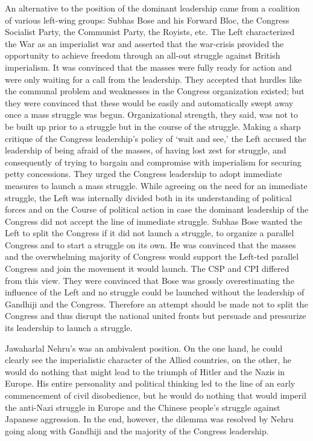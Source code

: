 \begin{multicols}{2}
An alternative to the position of the dominant leadership came from a coalition of various left-wing groups: Subhas Bose and his Forward Bloc, the Congress Socialist Party, the Communist Party, the Royists, etc. The Left characterized the War as an imperialist war and asserted that the war-crisis provided the opportunity to achieve freedom through an all-out struggle against British imperialism. It was convinced that the masses were fully ready for action and were only waiting for a call from the leadership. They accepted that hurdles like the communal problem and weaknesses in the Congress organization existed; but they were convinced that these would be easily and automatically swept away once a mass struggle was begun. Organizational strength, they said, was not to be built up prior to a struggle but in the course of the struggle. Making a sharp critique of the Congress leadership's policy of `wait and see,' the Left accused the leadership of being afraid of the masses, of having lost zest for struggle, and consequently of trying to bargain and compromise with imperialism for securing petty concessions. They urged the Congress leadership to adopt immediate measures to launch a mass struggle. While agreeing on the need for an immediate struggle, the Left was internally divided both in its understanding of political forces and on the Course of political action in case the dominant leadership of the Congress did not accept the line of immediate struggle. Subhas Bose wanted the Left to split the Congress if it did not launch a struggle, to organize a parallel Congress and to start a struggle on its own. He was convinced that the masses and the overwhelming majority of Congress would support the Left-ted parallel Congress and join the movement it would launch. The CSP and CPI differed from this view. They were convinced that Bose was grossly overestimating the influence of the Left and no struggle could be launched without the leadership of Gandhiji and the Congress. Therefore an attempt should be made not to split the Congress and thus disrupt the national united fronts but persuade and pressurize its leadership to launch a struggle. 

Jawaharlal Nehru's was an ambivalent position. On the one hand, he could clearly see the imperialistic character of the Allied countries, on the other, he would do nothing that might lead to the triumph of Hitler and the Nazis in Europe. His entire personality and political thinking led to the line of an early commencement of civil disobedience, but he would do nothing that would imperil the anti-Nazi struggle in Europe and the Chinese people's struggle against Japanese aggression. In the end, however, the dilemma was resolved by Nehru going along with Gandhiji and the majority of the Congress leadership. 


\end{multicols}
